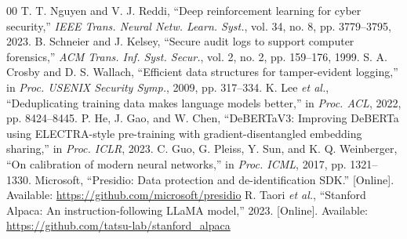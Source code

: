 \documentclass[conference]{IEEEtran}
\begin{document}
\begin{thebibliography}{00}
 T. T. Nguyen and V. J. Reddi, ``Deep reinforcement learning for cyber security,'' \textit{IEEE Trans. Neural Netw. Learn. Syst.}, vol. 34, no. 8, pp. 3779--3795, 2023.
 B. Schneier and J. Kelsey, ``Secure audit logs to support computer forensics,'' \textit{ACM Trans. Inf. Syst. Secur.}, vol. 2, no. 2, pp. 159--176, 1999.
 S. A. Crosby and D. S. Wallach, ``Efficient data structures for tamper-evident logging,'' in \textit{Proc. USENIX Security Symp.}, 2009, pp. 317--334.
 K. Lee \textit{et al.}, ``Deduplicating training data makes language models better,'' in \textit{Proc. ACL}, 2022, pp. 8424--8445.
 P. He, J. Gao, and W. Chen, ``DeBERTaV3: Improving DeBERTa using ELECTRA-style pre-training with gradient-disentangled embedding sharing,'' in \textit{Proc. ICLR}, 2023.
 C. Guo, G. Pleiss, Y. Sun, and K. Q. Weinberger, ``On calibration of modern neural networks,'' in \textit{Proc. ICML}, 2017, pp. 1321--1330.
 Microsoft, ``Presidio: Data protection and de-identification SDK.'' [Online]. Available: \url{https://github.com/microsoft/presidio}
 R. Taori \textit{et al.}, ``Stanford Alpaca: An instruction-following LLaMA model,'' 2023. [Online]. Available: \url{https://github.com/tatsu-lab/stanford_alpaca}
\end{thebibliography}
\end{document}
